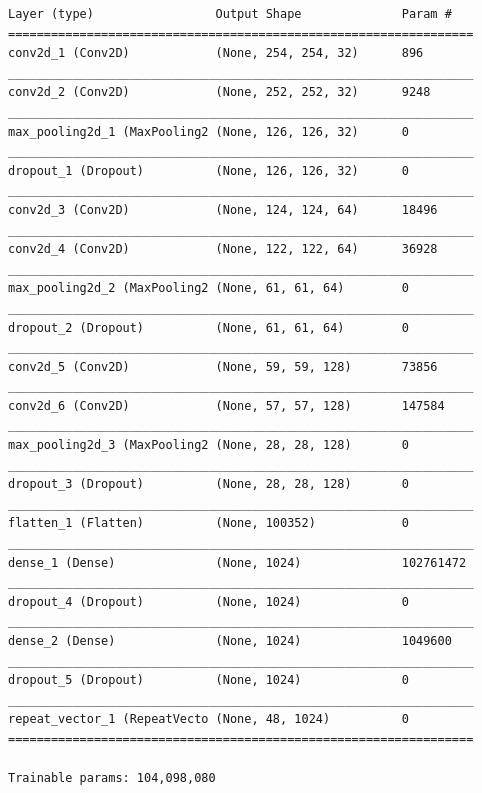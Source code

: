 \documentclass[pdftex,a4paper,halfparskip, article]{scrartcl}
\begin{document}
\begin{verbatim}
Layer (type)                 Output Shape              Param #   
=================================================================
conv2d_1 (Conv2D)            (None, 254, 254, 32)      896       
_________________________________________________________________
conv2d_2 (Conv2D)            (None, 252, 252, 32)      9248      
_________________________________________________________________
max_pooling2d_1 (MaxPooling2 (None, 126, 126, 32)      0         
_________________________________________________________________
dropout_1 (Dropout)          (None, 126, 126, 32)      0         
_________________________________________________________________
conv2d_3 (Conv2D)            (None, 124, 124, 64)      18496     
_________________________________________________________________
conv2d_4 (Conv2D)            (None, 122, 122, 64)      36928     
_________________________________________________________________
max_pooling2d_2 (MaxPooling2 (None, 61, 61, 64)        0         
_________________________________________________________________
dropout_2 (Dropout)          (None, 61, 61, 64)        0         
_________________________________________________________________
conv2d_5 (Conv2D)            (None, 59, 59, 128)       73856     
_________________________________________________________________
conv2d_6 (Conv2D)            (None, 57, 57, 128)       147584    
_________________________________________________________________
max_pooling2d_3 (MaxPooling2 (None, 28, 28, 128)       0         
_________________________________________________________________
dropout_3 (Dropout)          (None, 28, 28, 128)       0         
_________________________________________________________________
flatten_1 (Flatten)          (None, 100352)            0         
_________________________________________________________________
dense_1 (Dense)              (None, 1024)              102761472 
_________________________________________________________________
dropout_4 (Dropout)          (None, 1024)              0         
_________________________________________________________________
dense_2 (Dense)              (None, 1024)              1049600   
_________________________________________________________________
dropout_5 (Dropout)          (None, 1024)              0         
_________________________________________________________________
repeat_vector_1 (RepeatVecto (None, 48, 1024)          0         
=================================================================

Trainable params: 104,098,080
\end{verbatim}
\end{document}

